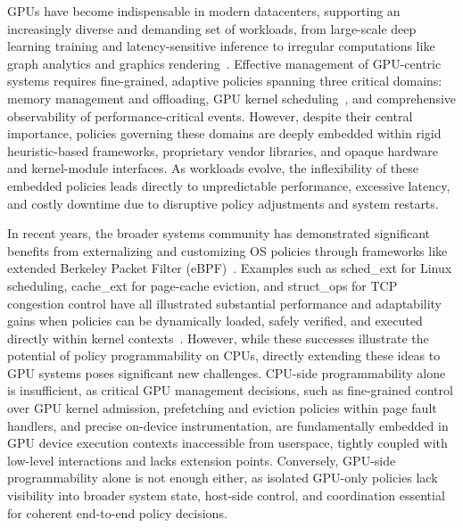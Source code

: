 GPUs have become indispensable in modern datacenters, supporting an increasingly diverse and demanding set of workloads, from large-scale deep learning training and latency-sensitive inference to irregular computations like graph analytics and graphics rendering~\cite{kousha2019designing,shen2018cudaadvisor,zhou2021measurement,stocks2024breaking,das2023large,fedeli2022pushing,liu2021closing,guan2024amanda,kwon2023efficient,pankratz2021vulkan,sellers2016vulkan}. Effective management of GPU-centric systems requires fine-grained, adaptive policies spanning three critical domains: memory management and offloading, GPU kernel scheduling~\cite{hong2017gpu,kato2011timegraph}, and comprehensive observability of performance-critical events. However, despite their central importance, policies governing these domains are deeply embedded within rigid heuristic-based frameworks, proprietary vendor libraries, and opaque hardware and kernel-module interfaces. As workloads evolve, the inflexibility of these embedded policies leads directly to unpredictable performance, excessive latency, and costly downtime due to disruptive policy adjustments and system restarts.


In recent years, the broader systems community has demonstrated significant benefits from externalizing and customizing OS policies through frameworks like extended Berkeley Packet Filter (eBPF)~\cite{eBPFWindows}. Examples such as sched\_ext for Linux scheduling, cache\_ext for page-cache eviction, and struct\_ops for TCP congestion control have all illustrated substantial performance and adaptability gains when policies can be dynamically loaded, safely verified, and executed directly within kernel contexts~\cite{gregg16,gregg2021computing,Bachl21,jia2023practical,Zhong22,yang2023lambda,jia2023programmable,ghigoff2021bmc,chen2025etran,xu2025state,benson2024netedit,zhou2024dint,wu2025vep,bpftime,mao2024merlin,jin2024beebox,wang2024seak,zhong2022xrp}. However, while these successes illustrate the potential of policy programmability on CPUs, directly extending these ideas to GPU systems poses significant new challenges. CPU-side programmability alone is insufficient, as critical GPU management decisions, such as fine-grained control over GPU kernel admission, prefetching and eviction policies within page fault handlers, and precise on-device instrumentation, are fundamentally embedded in GPU device execution contexts inaccessible from userspace, tightly coupled with low-level interactions and lacks extension points. Conversely, GPU-side programmability alone is not enough either, as isolated GPU-only policies lack visibility into broader system state, host-side control, and coordination essential for coherent end-to-end policy decisions.

